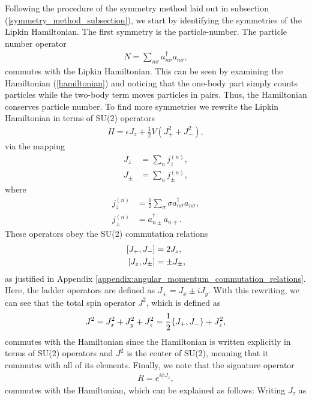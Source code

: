 \documentclass[10pt]{article}
\begin{document}
Following the procedure of the symmetry method laid out in subsection (\ref{symmetry_method_subsection}), we start by identifying the symmetries of the Lipkin Hamiltonian. The first symmetry is the particle-number. The particle number operator
\begin{align}
N=\sum_{n\sigma}a^\dagger_{n\sigma}a_{n\sigma}
,\end{align}
commutes with the Lipkin Hamiltonian. This can be seen by examining the Hamiltonian (\ref{hamiltonian}) and noticing that the one-body part simply counts particles while the two-body term moves particles in pairs. Thus, the Hamiltonian conserves particle number. To find more symmetries we rewrite the Lipkin Hamiltonian in terms of SU(2) operators
\begin{align}
\label{lipkin_symmetry_hamiltonian}
H = \epsilon J_z + \frac{1}{2}V(J^2_++J^2_-),
\end{align}
via the mapping
\begin{align}
\label{jz}
J_z
&=
\sum_{n}j_z^{(n)},
\\
\label{jpm}
J_\pm&=\sum_nj^{(n)}_{\pm},
\end{align}
where
\begin{align}
\label{small_jz}
j_z^{(n)}
&=
\frac{1}{2}\sum_{\sigma}\sigma a^\dagger_{n\sigma}a_{n\sigma},
\\
\label{small_jpm}
j^{(n)}_{\pm}
&=
a^\dagger_{n\pm}a_{n\mp}.
\end{align}
These operators obey the SU(2) commutation relations
\begin{align}
\label{comm1}
\comm{J_+}{J_-}&=2J_z,
\\
\label{comm2}
\comm{J_z}{J_\pm}&=\pm J_\pm,
\end{align}
as justified in Appendix \ref{appendix:angular_momentum_commutation_relations}. Here, the ladder operators are defined as $J_{\pm}= J_x\pm iJ_y$. With this rewriting, we can see that the total spin operator $J^2$, which is defined as 
\begin{align}
J^2= J^2_x+J^2_y+J^2_z =
\frac{1}{2}\acomm{J_+}{J_-}+J_z^2
,\end{align}
commutes with the Hamiltonian since the Hamiltonian is written explicitly in terms of SU(2) operators and $J^2$ is the center of SU(2), meaning that it commutes with all of its elements. Finally, we note that the signature operator
\begin{align}
R=e^{i\phi J_z}
,\end{align}
commutes with the Hamiltonian, which can be explained as follows: Writing $J_z$ as
\end{document}
